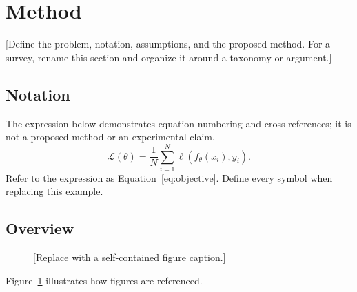 \section{Method}\label{sec:method}
[Define the problem, notation, assumptions, and the proposed method. For a
survey, rename this section and organize it around a taxonomy or argument.]

\subsection{Notation}
The expression below demonstrates equation numbering and cross-references;
it is not a proposed method or an experimental claim.
\begin{equation}\label{eq:objective}
  \mathcal{L}(\theta)
  = \frac{1}{N}\sum_{i=1}^{N}
    \ell\!\left(f_{\theta}(x_i),y_i\right).
\end{equation}
Refer to the expression as Equation~\eqref{eq:objective}. Define every symbol
when replacing this example.

\subsection{Overview}
\begin{figure}[htbp]
  \centering
  \caption{[Replace with a self-contained figure caption.]}
  \label{fig:overview}
\end{figure}
Figure~\ref{fig:overview} illustrates how figures are referenced.
